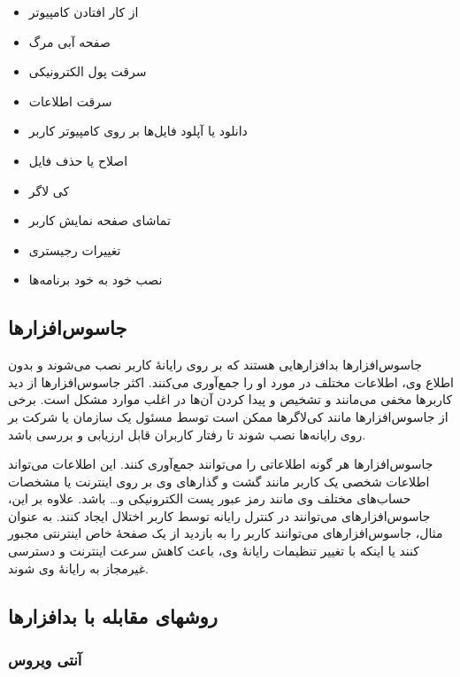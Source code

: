 \documentclass[12pt]{book}
\begin{document}
\begin{itemize}
	\item از کار افتادن کامپیوتر
	\item صفحه آبی مرگ
	\item سرقت پول الکترونیکی
	\item سرقت اطلاعات
	\item دانلود یا آپلود فایل‌ها بر روی کامپیوتر کاربر
	\item اصلاح یا حذف فایل
	\item کی لاگر
	\item تماشای صفحه نمایش کاربر
	\item تغییرات رجیستری
	\item نصب خود به خود برنامه‌ها
\end{itemize}




\subsection{جاسوس‌افزارها}

جاسوس‌افزارها 
 بدافزارهایی هستند که بر روی رایانهٔ کاربر نصب می‌شوند و بدون اطلاع وی، اطلاعات مختلف در مورد او را جمع‌آوری می‌کنند. اکثر جاسوس‌افزارها از دید کاربرها مخفی می‌مانند و تشخیص و پیدا کردن آن‌ها در اغلب موارد مشکل است. برخی از جاسوس‌افزارها مانند کی‌لاگرها ممکن است توسط مسئول یک سازمان یا شرکت بر روی رایانه‌ها نصب شوند تا رفتار کاربران قابل ارزیابی و بررسی باشد.

جاسوس‌افزارها هر گونه اطلاعاتی را می‌توانند جمع‌آوری کنند. این اطلاعات می‌تواند اطلاعات شخصی یک کاربر مانند گشت و گذارهای وی بر روی اینترنت یا مشخصات حساب‌های مختلف وی مانند رمز عبور پست الکترونیکی و… باشد. علاوه بر این، جاسوس‌افزارهای می‌توانند در کنترل رایانه توسط کاربر اختلال ایجاد کنند. به عنوان مثال، جاسوس‌افزارهای می‌توانند کاربر را به بازدید از یک صفحهٔ خاص اینترنتی مجبور کنند یا اینکه با تغییر تنظیمات رایانهٔ وی، باعث کاهش سرعت اینترنت و دسترسی غیرمجاز به رایانهٔ وی شوند.



\subsection{روشهای مقابله با بدافزارها}



\subsubsection{
آنتی ویروس
}
\end{document}
